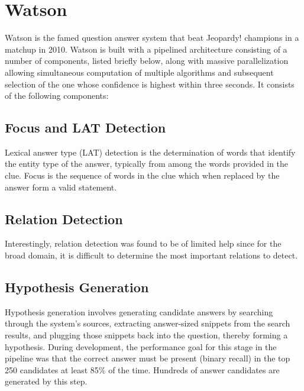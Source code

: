 \section{Watson}

Watson \cite{ferrucci2010building} is the famed question answer system that beat Jeopardy! champions in a matchup in 2010.  Watson is built with a pipelined architecture consisting of a number of components, listed briefly below, along with massive parallelization allowing simultaneous computation of multiple algorithms and subsequent selection of the one whose confidence is highest within three seconds.  It consists of the following components:

\subsection{Focus and LAT Detection}

Lexical answer type (LAT) detection is the determination of words that identify the entity type of the answer, typically from among the words provided in the clue.  Focus is the sequence of words in the clue which when replaced by the answer form a valid statement.

\subsection{Relation Detection}

Interestingly, relation detection was found to be of limited help since for the broad domain, it is difficult to determine the most important relations to detect.

\subsection{Hypothesis Generation}

Hypothesis generation involves generating candidate answers by searching through the system’s sources, extracting answer-sized snippets from the search results, and plugging those snippets back into the question, thereby forming a hypothesis.  During development, the performance goal for this stage in the pipeline was that the correct answer must be present (binary recall) in the top 250 candidates at least 85\% of the time.  Hundreds of answer candidates are generated by this step.

